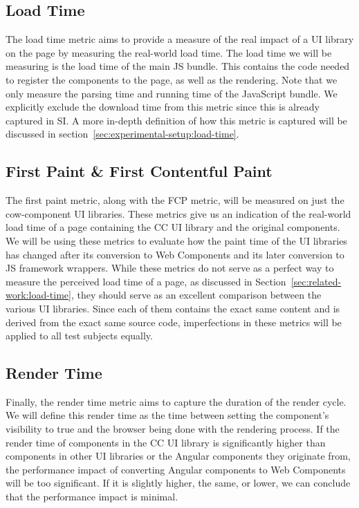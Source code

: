 \subsection{Load Time}
The load time metric aims to provide a measure of the real impact of a UI library on the page by measuring the real-world load time. The load time we will be measuring is the load time of the main JS bundle. This contains the code needed to register the components to the page, as well as the rendering. Note that we only measure the parsing time and running time of the JavaScript bundle. We explicitly exclude the download time from this metric since this is already captured in SI\@. A more in-depth definition of how this metric is captured will be discussed in section~\ref{sec:experimental-setup:load-time}.

\subsection{First Paint \& First Contentful Paint}
The first paint metric, along with the FCP metric, will be measured on just the cow-component UI libraries. These metrics give us an indication of the real-world load time of a page containing the CC UI library and the original components. We will be using these metrics to evaluate how the paint time of the UI libraries has changed after its conversion to Web Components and its later conversion to JS framework wrappers. While these metrics do not serve as a perfect way to measure the perceived load time of a page, as discussed in Section~\ref{sec:related-work:load-time}, they should serve as an excellent comparison between the various UI libraries. Since each of them contains the exact same content and is derived from the exact same source code, imperfections in these metrics will be applied to all test subjects equally.

\subsection{Render Time}
Finally, the render time metric aims to capture the duration of the render cycle. We will define this render time as the time between setting the component's visibility to true and the browser being done with the rendering process. If the render time of components in the CC UI library is significantly higher than components in other UI libraries or the Angular components they originate from, the performance impact of converting Angular components to Web Components will be too significant. If it is slightly higher, the same, or lower, we can conclude that the performance impact is minimal.

